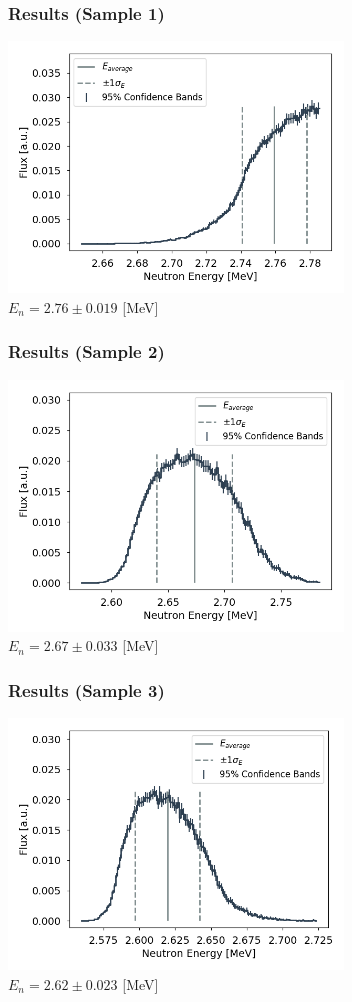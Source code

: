 \documentclass[12pt,xcolor=dvipsnames]{beamer}
\begin{document}
\begin{frame}
\frametitle{Results (Sample 1)}
\centering
\includegraphics[width=3.5in]{009False.png}\\
$E_n=2.76\pm 0.019$ [MeV]
\end{frame}

\begin{frame}
\frametitle{Results (Sample 2)}
\centering
\includegraphics[width=3.5in]{989False.png}\\
$E_n=2.67\pm 0.033$ [MeV]
\end{frame}

\begin{frame}
\frametitle{Results (Sample 3)}
\centering
\includegraphics[width=3.5in]{1809False.png}\\
$E_n=2.62\pm 0.023$ [MeV]
\end{frame}
\end{document}
